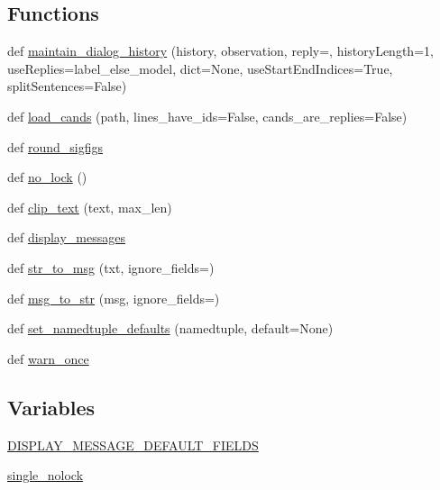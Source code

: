 \subsection*{Functions}
\begin{DoxyCompactItemize}
\item 
def \hyperlink{namespaceparlai_1_1utils_1_1misc_ac8ca45e62ca906d9b6e5026588a5d2a2}{maintain\+\_\+dialog\+\_\+history} (history, observation, reply=\textquotesingle{}\textquotesingle{}, history\+Length=1, use\+Replies=\textquotesingle{}label\+\_\+else\+\_\+model\textquotesingle{}, dict=None, use\+Start\+End\+Indices=True, split\+Sentences=False)
\item 
def \hyperlink{namespaceparlai_1_1utils_1_1misc_ad935ab0a9d49b897c5e3efdbe1c46c4d}{load\+\_\+cands} (path, lines\+\_\+have\+\_\+ids=False, cands\+\_\+are\+\_\+replies=False)
\item 
def \hyperlink{namespaceparlai_1_1utils_1_1misc_a85b4447d47998393aaca2c83660f096e}{round\+\_\+sigfigs}
\item 
def \hyperlink{namespaceparlai_1_1utils_1_1misc_a38a23cfa0fc3dbed42846787d1c04b57}{no\+\_\+lock} ()
\item 
def \hyperlink{namespaceparlai_1_1utils_1_1misc_a219b248f4399036a381ca859aa97433e}{clip\+\_\+text} (text, max\+\_\+len)
\item 
def \hyperlink{namespaceparlai_1_1utils_1_1misc_a7c86f996f4b55a960da46c1142a2c507}{display\+\_\+messages}
\item 
def \hyperlink{namespaceparlai_1_1utils_1_1misc_a1b053cd9c56e6fa79b058fff587b3a48}{str\+\_\+to\+\_\+msg} (txt, ignore\+\_\+fields=\textquotesingle{}\textquotesingle{})
\item 
def \hyperlink{namespaceparlai_1_1utils_1_1misc_ae5db473b41d3b49814e2566e866282b6}{msg\+\_\+to\+\_\+str} (msg, ignore\+\_\+fields=\textquotesingle{}\textquotesingle{})
\item 
def \hyperlink{namespaceparlai_1_1utils_1_1misc_a8781cc03272b3a118fcd9e5a9f4ca1dd}{set\+\_\+namedtuple\+\_\+defaults} (namedtuple, default=None)
\item 
def \hyperlink{namespaceparlai_1_1utils_1_1misc_a884a3aefa90581f53bc592fa6a78dc43}{warn\+\_\+once}
\end{DoxyCompactItemize}
\subsection*{Variables}
\begin{DoxyCompactItemize}
\item 
\hyperlink{namespaceparlai_1_1utils_1_1misc_a122146c75d0e6910340a6a851d097bdc}{D\+I\+S\+P\+L\+A\+Y\+\_\+\+M\+E\+S\+S\+A\+G\+E\+\_\+\+D\+E\+F\+A\+U\+L\+T\+\_\+\+F\+I\+E\+L\+DS}
\item 
\hyperlink{namespaceparlai_1_1utils_1_1misc_a5d6ad7f3aef96f16bb9060f5a41fc39b}{single\+\_\+nolock}
\end{DoxyCompactItemize}


